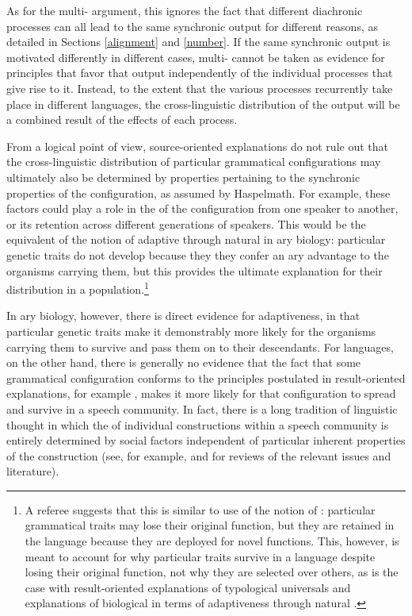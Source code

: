 \documentclass[output=paper]{langsci/langscibook}
\begin{document}
As for the multi- argument, this
ignores the fact that different
diachronic processes can all lead to the same synchronic output for
different reasons, as detailed in Sections \ref{alignment} and
\ref{number}. If the same synchronic output is motivated
differently in different cases, multi- cannot be taken as
evidence for principles that favor that output
independently of the individual processes that give rise to
it. Instead, to the extent that the various processes recurrently take place in
different languages, the cross-linguistic distribution of the output
will be a combined result of the effects of each process. 

From a logical point of view, source-oriented explanations do not rule
out that the cross-linguistic distribution of particular grammatical
configurations may ultimately also be determined by properties
pertaining to the synchronic properties of the configuration, as
assumed by Haspelmath. For example, these factors could play a role in
the  of the configuration from one speaker to another, or
its retention across different generations of speakers. This would be
the equivalent of the notion of adaptive  through natural
 in ary
biology: particular genetic traits do not develop because they
they confer an ary advantage to the organisms
carrying them, but this provides the ultimate explanation for their
distribution in a population.\footnote{A referee suggests that this is
  similar to  use of the notion of
  : particular grammatical traits may lose their original
  function, but they are retained in the language because they are
  deployed for novel functions.  This, however, is meant to account for why
  particular traits  survive in a language despite losing their
  original function, not why they are
  selected over others, as is the case with result-oriented
  explanations of typological universals and explanations of
  biological  in terms of adaptiveness through natural .}
  
\newpage
In ary biology, however, there is direct evidence for
adaptiveness, in that particular genetic traits make it  demonstrably more likely for the organisms
carrying them to survive and pass them on to their
descendants. For languages, on the other hand, there is generally no evidence that the
fact that some grammatical configuration conforms to the principles
postulated in result-oriented explanations, for example , makes 
it more likely for that configuration to spread and survive in a
speech community. In fact, there is a long tradition of
linguistic thought in which the  of individual
constructions within  a speech community is entirely determined by
social factors independent of particular inherent properties of the
construction (see, for example, \citealt{McMahon1994}
and \citealt{BillLC} for reviews of the relevant issues and
literature). 
\end{document}
